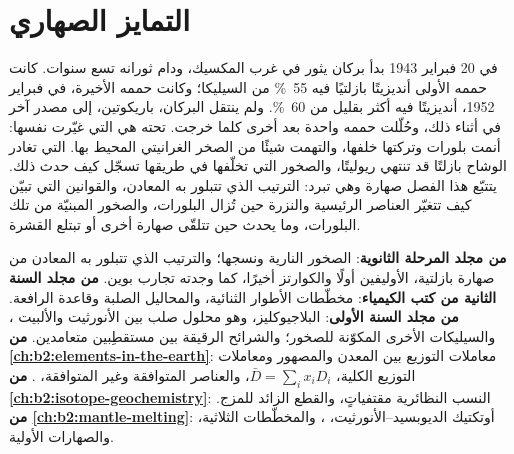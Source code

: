 \chapter{التمايز الصهاري}\label{ch:b2:magmatic-differentiation}

في 20 فبراير 1943 بدأ بركان يثور في غرب المكسيك، ودام ثورانه
تسع سنوات. كانت حممه الأولى أنديزيتًا بازلتيًا فيه \qty{55}{\percent} من
السيليكا؛ وكانت حممه الأخيرة، في فبراير 1952، أنديزيتًا فيه أكثر بقليل من
\qty{60}{\percent}. ولم ينتقل البركان، باريكوتين، إلى مصدر آخر في
أثناء ذلك، وحُلّلت حممه واحدة بعد أخرى كلما خرجت. 
تحته هي التي غيّرت نفسها: أنمت بلورات وتركتها خلفها، والتهمت
شيئًا من الصخر الغرانيتي المحيط بها.  التي تغادر الوشاح بازلتًا قد
تنتهي ريوليتًا، والصخور التي تخلّفها في طريقها تسجّل كيف حدث ذلك.
يتتبّع هذا الفصل صهارة وهي تبرد: الترتيب الذي تتبلور به المعادن،
والقوانين التي تبيّن كيف تتغيّر العناصر الرئيسية والنزرة حين تُزال البلورات،
والصخور المبنيّة من تلك البلورات، وما يحدث حين تتلقّى 
صهارة أخرى أو تبتلع القشرة.

\begin{recall}
\textbf{من مجلد المرحلة الثانوية}: الصخور النارية ونسجها؛ والترتيب
الذي تتبلور به المعادن من صهارة بازلتية، الأوليفين أولًا والكوارتز أخيرًا،
كما وجدته تجارب بوين. \textbf{من مجلد السنة الثانية من كتب الكيمياء}:
مخطّطات الأطوار الثنائية، والمحاليل الصلبة وقاعدة الرافعة. \textbf{من مجلد السنة
الأولى}: البلاجيوكليز، وهو محلول صلب بين الأنورثيت 
والألبيت ، والسيليكات الأخرى المكوّنة للصخور؛ والشرائح الرقيقة بين
مستقطِبين متعامدين. \textbf{من \cref{ch:b2:elements-in-the-earth}}: معاملات التوزيع بين المعدن والمصهور
ومعاملات التوزيع الكلية، $\bar D = \sum_i x_i D_i$، والعناصر المتوافقة وغير المتوافقة،
 . \textbf{من
\cref{ch:b2:isotope-geochemistry}}: النسب النظائرية مقتفياتٍ، والقطع
الزائد للمزج. \textbf{من \cref{ch:b2:mantle-melting}}: أوتكتيك الديوبسيد--الأنورثيت،
، والمخطّطات الثلاثية، والصهارات الأولية.
\end{recall}

